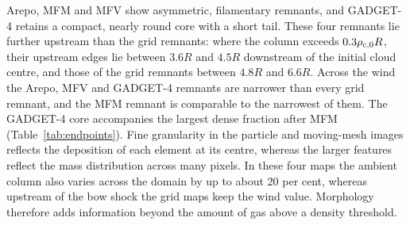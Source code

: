 \documentclass[twocolumn,apj,numberedappendix]{openjournal}
\begin{document}
Arepo, MFM and MFV show asymmetric, filamentary remnants, and GADGET-4 retains a compact, nearly round core with a short tail. These four remnants lie further upstream than the grid remnants: where the column exceeds $0.3\rho_{\rm c,0}R$, their upstream edges lie between $3.6R$ and $4.5R$ downstream of the initial cloud centre, and those of the grid remnants between $4.8R$ and $6.6R$. Across the wind the Arepo, MFV and GADGET-4 remnants are narrower than every grid remnant, and the MFM remnant is comparable to the narrowest of them. The GADGET-4 core accompanies the largest dense fraction after MFM (Table~\ref{tab:endpoints}). Fine granularity in the particle and moving-mesh images reflects the deposition of each element at its centre, whereas the larger features reflect the mass distribution across many pixels. In these four maps the ambient column also varies across the domain by up to about 20 per cent, whereas upstream of the bow shock the grid maps keep the wind value. Morphology therefore adds information beyond the amount of gas above a density threshold.
\end{document}
